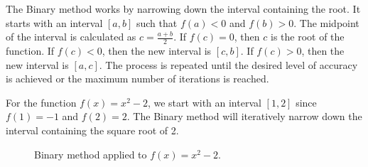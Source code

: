 \documentclass{article}
\theoremstyle{definition}
\begin{document}
The Binary method works by narrowing down the interval containing the root. It starts with an interval $[a, b]$ such that $f(a) < 0$ and $f(b) > 0$. The midpoint of the interval is calculated as $c = \frac{a+b}{2}$. If $f(c) = 0$, then $c$ is the root of the function. If $f(c) < 0$, then the new interval is $[c, b]$. If $f(c) > 0$, then the new interval is $[a, c]$. The process is repeated until the desired level of accuracy is achieved or the maximum number of iterations is reached.

For the function $f(x) = x^2 - 2$, we start with an interval $[1, 2]$ since $f(1) = -1$ and $f(2) = 2$. The Binary method will iteratively narrow down the interval containing the square root of 2.

\begin{figure}[ht]
	\centering
	\caption{Binary method applied to $f(x) = x^2 - 2$.}
\end{figure}
\newpage
\end{document}
